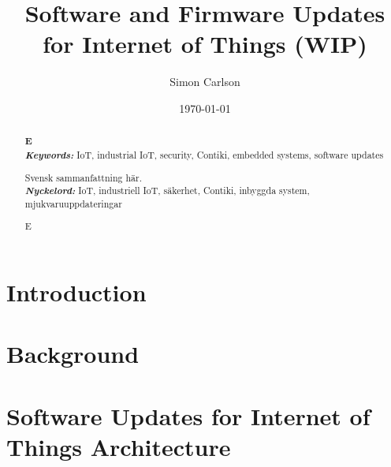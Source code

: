 \documentclass{kththesis}
\title{Software and Firmware Updates for Internet of Things (WIP)}
\author{Simon Carlson}
\date{\today}
\providecommand{\keywords}[1]{\textbf{\textit{Keywords:}} #1}
\providecommand{\nyckelord}[1]{\textbf{\textit{Nyckelord:}} #1}
\begin{document}
\frontmatter

\titlepage

\begin{abstract}
\textbf{E}\\


\noindent\keywords{IoT, industrial IoT, security, Contiki, embedded systems, 
                    software updates}
\end{abstract}

\begin{otherlanguage}{swedish}
    \begin{abstract}
        Svensk sammanfattning här.\\

        \noindent\nyckelord{IoT, industriell IoT, säkerhet, Contiki, inbyggda system,
                            mjukvaruuppdateringar}
    \end{abstract}
\end{otherlanguage}


\renewcommand{\abstractname}{Acknowledgements}
\begin{abstract}
    E
\end{abstract}

\tableofcontents
\listoftables
\listoffigures
\printglossaries

\mainmatter


\chapter{Introduction}


\chapter{Background}


\chapter{Software Updates for Internet of Things Architecture}

\end{document}
